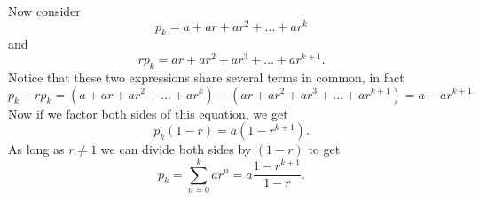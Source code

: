 %
%
%
%

Now consider
\[
p_{k}=a + ar + ar^{2} + \ldots + ar^k
\]
and
\[
rp_{k} = ar + ar^{2} + ar^{3} + \ldots + ar^{k+1}.
\]
Notice that these two expressions share several terms in common, in
fact
\[
p_{k}-rp_{k}= (a + ar + ar^{2} + \ldots + ar^k) - (ar +
ar^{2} + ar^{3} + \ldots + ar^{k+1}) = a -ar^{k+1}
\]
Now if we factor both sides of this equation, we get
\[
p_{k}(1-r)=a(1-r^{k+1}).
\]
As
long as $r \neq 1$ we can divide both sides by $(1-r)$ to get
\[
p_{k}=\sum_{n=0}^{k}ar^n=a\frac{1-r^{k+1}}{1-r}.
\]

